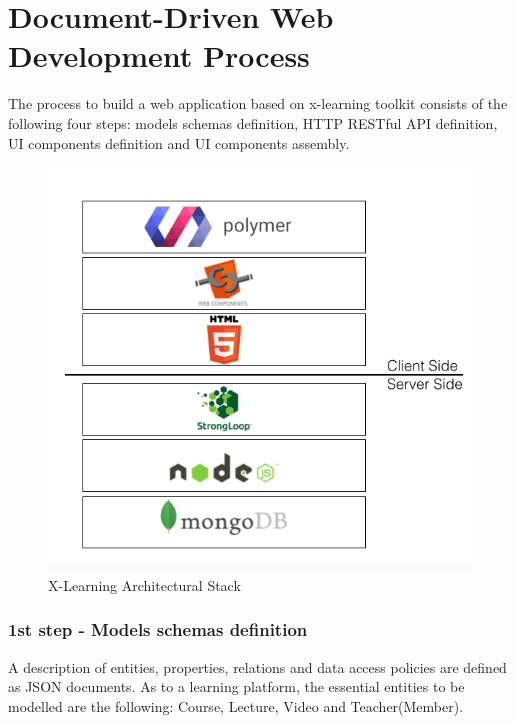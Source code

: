 \section{Document-Driven Web Development Process}
\label{sec:document-driven web_development_process}

The process to build a web application based on x-learning toolkit consists of the following four steps: models schemas definition, HTTP RESTful API definition, UI components definition and UI components  assembly.


\begin{figure}[htb] %
 \centering
 \includegraphics[width=1.0\linewidth]{images/chapter3/XPR_stack.png}\hfill
 \caption[X-learning Architectural Stack]{X-Learning Architectural Stack}
 \label{fig:fourV}
\end{figure}

\subsubsection {1st step - Models schemas definition}
\label{subsec:1st_step_models_schemas_definitio}


A description of entities, properties, relations and data access policies are defined as JSON  documents.
As to a learning platform, the essential entities to be modelled are the following: Course, Lecture, Video and Teacher(Member).

